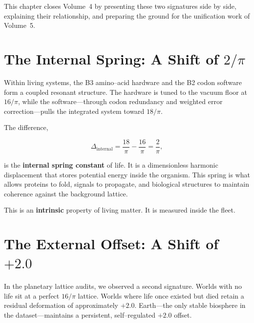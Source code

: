 \documentclass[11pt, letterpaper, openany]{book}
\begin{document}
This chapter closes Volume~4 by presenting these two signatures side by side,
explaining their relationship, and preparing the ground for the unification
work of Volume~5.


\section{The Internal Spring: A Shift of $2/\pi$}

Within living systems, the B3 amino–acid hardware and the B2 codon software
form a coupled resonant structure. The hardware is tuned to the vacuum floor at
$16/\pi$, while the software---through codon redundancy and weighted error
correction---pulls the integrated system toward $18/\pi$.

The difference,



\[
\Delta_{\text{internal}} = \frac{18}{\pi} - \frac{16}{\pi} = \frac{2}{\pi},
\]



is the \textbf{internal spring constant} of life. It is a dimensionless harmonic
displacement that stores potential energy inside the organism. This spring is
what allows proteins to fold, signals to propagate, and biological structures to
maintain coherence against the background lattice.

This is an \textbf{intrinsic} property of living matter.  
It is measured inside the fleet.


\section{The External Offset: A Shift of $+2.0$}

In the planetary lattice audits, we observed a second signature. Worlds with no
life sit at a perfect $16/\pi$ lattice. Worlds where life once existed but died
retain a residual deformation of approximately $+2.0$. Earth---the only stable
biosphere in the dataset---maintains a persistent, self–regulated $+2.0$
offset.
\end{document}
